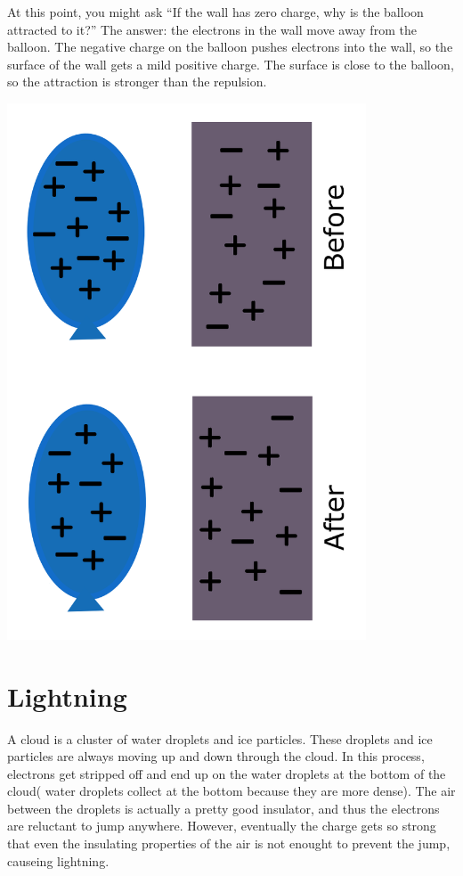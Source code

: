 At this point, you might ask ``If the wall has zero
charge, why is the balloon attracted to it?'' The answer: the
electrons in the wall move away from the balloon. The negative charge
on the balloon pushes electrons into the wall, so the surface of the
wall gets a mild positive charge. The surface is close to the balloon,
so the attraction is stronger than the repulsion.

\includegraphics[width=0.8\textwidth]{Ballon_Diagram.png}

\section{Lightning}

A cloud is a cluster of water droplets and ice particles. These
droplets and ice particles are always moving up and down through the
cloud. In this process, electrons get stripped off and end up on the
water droplets at the bottom of the cloud( water droplets collect at the bottom because they are more dense). The air between the
droplets is actually a pretty good insulator, and thus the electrons are reluctant
to jump anywhere. However, eventually the charge gets so strong that
even the insulating properties of the air is not enought to prevent
the jump, causeing lightning.

